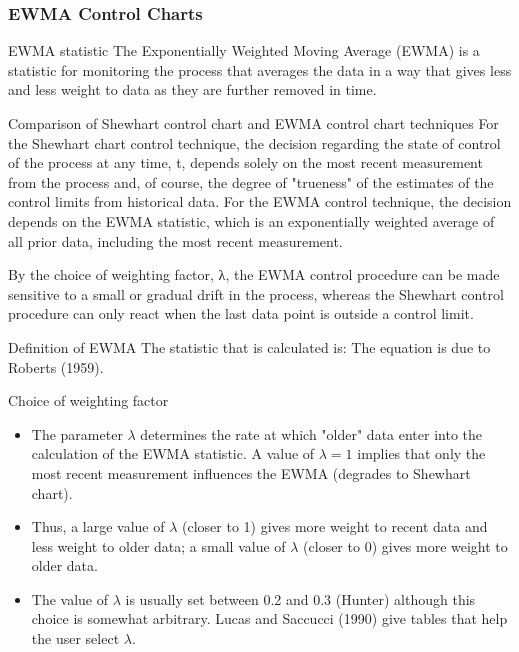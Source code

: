 \documentclass[Charts101.tex]{subfiles}
\begin{document}
\begin{frame}
\frametitle{EWMA Control Charts}

EWMA statistic	
The Exponentially Weighted Moving Average (EWMA) is a statistic for monitoring the process that averages the data 
in a way that gives less and less weight to data as they are further removed in time.
\end{frame}
\begin{frame}
Comparison of Shewhart control chart and EWMA control chart techniques	For the Shewhart chart control technique, the decision regarding the state of control of the process at any time, t, depends solely on the most recent measurement from the process and, of course, the degree of "trueness" of the estimates of the control limits from historical data. For the EWMA control technique, the decision depends on the EWMA statistic, which is an exponentially weighted average of all prior data, including the most recent measurement.
\end{frame}
\begin{frame}
By the choice of weighting factor, λ, the EWMA control procedure can be made sensitive to a small or gradual drift in the process, whereas the Shewhart control procedure can only react when the last data point is outside a control limit.
\end{frame}
\begin{frame}
Definition of EWMA	The statistic that is calculated is:
The equation is due to Roberts (1959).
\end{frame}
\begin{frame}

Choice of weighting factor	
\begin{itemize}
\item The parameter $\lambda$ determines the rate at which "older" data enter into the calculation of the EWMA statistic. A value of $\lambda=1$ implies that only the most recent measurement influences the EWMA (degrades to Shewhart chart). 
\item Thus, a large value of $\lambda$ (closer to 1) gives more weight to recent data and less weight to older data; a small value of $\lambda$ (closer to 0) gives more weight to older data. 
\item The value of $\lambda$ is usually set between 0.2 and 0.3 (Hunter) although this choice is somewhat arbitrary. Lucas and Saccucci (1990) give tables that help the user select $\lambda$.
\end{itemize}
\end{frame}
\end{document}
